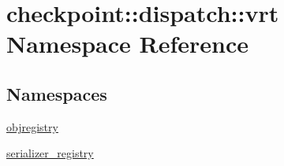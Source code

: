 \hypertarget{namespacecheckpoint_1_1dispatch_1_1vrt}{}\section{checkpoint\+:\+:dispatch\+:\+:vrt Namespace Reference}
\label{namespacecheckpoint_1_1dispatch_1_1vrt}
\subsection*{Namespaces}
\begin{DoxyCompactItemize}
\item 
 \hyperlink{namespacecheckpoint_1_1dispatch_1_1vrt_1_1objregistry}{objregistry}
\item 
 \hyperlink{namespacecheckpoint_1_1dispatch_1_1vrt_1_1serializer__registry}{serializer\+\_\+registry}
\end{DoxyCompactItemize}

